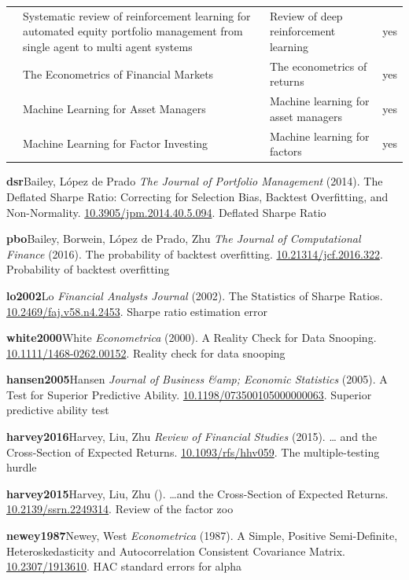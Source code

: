\begin{tabular}{@{}P{1.32in}P{2.00in}P{0.92in}P{0.36in}@{}}
 & Systematic review of reinforcement learning for automated equity portfolio management from single agent to multi agent systems & Review of deep reinforcement learning & yes \\
 & The Econometrics of Financial Markets & The econometrics of returns & yes \\
 & Machine Learning for Asset Managers & Machine learning for asset managers & yes \\
 & Machine Learning for Factor Investing & Machine learning for factors & yes \\
\bottomrule
\end{tabular}

\noindent\textbf{dsr}\quad Bailey, López de Prado \emph{The Journal of Portfolio Management} (2014). The Deflated Sharpe Ratio: Correcting for Selection Bias, Backtest Overfitting, and Non-Normality. \url{10.3905/jpm.2014.40.5.094}. Deflated Sharpe Ratio\par
\noindent\textbf{pbo}\quad Bailey, Borwein, López de Prado, Zhu \emph{The Journal of Computational Finance} (2016). The probability of backtest overfitting. \url{10.21314/jcf.2016.322}. Probability of backtest overfitting\par
\noindent\textbf{lo2002}\quad Lo \emph{Financial Analysts Journal} (2002). The Statistics of Sharpe Ratios. \url{10.2469/faj.v58.n4.2453}. Sharpe ratio estimation error\par
\noindent\textbf{white2000}\quad White \emph{Econometrica} (2000). A Reality Check for Data Snooping. \url{10.1111/1468-0262.00152}. Reality check for data snooping\par
\noindent\textbf{hansen2005}\quad Hansen \emph{Journal of Business \&amp; Economic Statistics} (2005). A Test for Superior Predictive Ability. \url{10.1198/073500105000000063}. Superior predictive ability test\par
\noindent\textbf{harvey2016}\quad Harvey, Liu, Zhu \emph{Review of Financial Studies} (2015). … and the Cross-Section of Expected Returns. \url{10.1093/rfs/hhv059}. The multiple-testing hurdle\par
\noindent\textbf{harvey2015}\quad Harvey, Liu, Zhu \emph{} (). …and the Cross-Section of Expected Returns. \url{10.2139/ssrn.2249314}. Review of the factor zoo\par
\noindent\textbf{newey1987}\quad Newey, West \emph{Econometrica} (1987). A Simple, Positive Semi-Definite, Heteroskedasticity and Autocorrelation Consistent Covariance Matrix. \url{10.2307/1913610}. HAC standard errors for alpha\par
